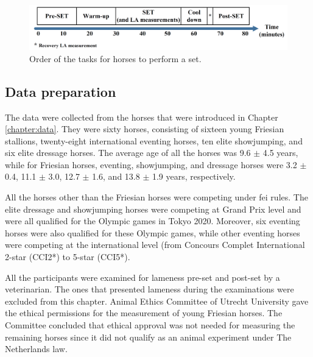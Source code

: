 \begin{figure}[htbp]
\centering
\includegraphics[width=.95\linewidth]{chapters/prepost/figures/SET.png}
\caption{Order of the tasks for horses to perform a \gls{set}.}
\label{SET}
\end{figure}

\subsection{Data preparation}

The data were collected from the horses that were introduced in Chapter \ref{chapter:data}. They were sixty horses, consisting of sixteen young Friesian stallions, twenty-eight international eventing horses, ten elite showjumping, and six elite dressage horses. The average age of all the horses was 9.6 $\pm$ 4.5 years, while for Friesian horses, eventing, showjumping, and dressage horses were 3.2 $\pm$ 0.4, 11.1 $\pm$ 3.0, 12.7 $\pm$ 1.6, and 13.8 $\pm$ 1.9 years, respectively. 

All the horses other than the Friesian horses were competing under \gls{fei} rules. The elite dressage and showjumping horses were competing at Grand Prix level and were all qualified for the Olympic games in Tokyo 2020. Moreover, six eventing horses were also qualified for these Olympic games, while other eventing horses were competing at the international level (from Concours Complet International 2-star (CCI2*) to 5-star (CCI5*).

All the participants were examined for lameness pre-\gls{set} and post-\gls{set} by a veterinarian. The ones that presented lameness during the examinations were excluded from this chapter. Animal Ethics Committee of Utrecht University gave the ethical permissions for the measurement of young Friesian horses. The Committee concluded that ethical approval was not needed for measuring the remaining horses since it did not qualify as an animal experiment under The Netherlands law.


